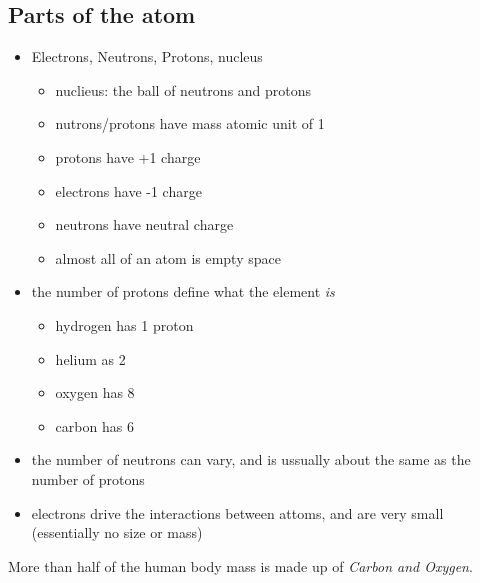 \documentclass{article}
\theoremstyle{definition}
\begin{document}
\subsection{Parts of the atom}
\begin{itemize}
	\item Electrons, Neutrons, Protons, nucleus 
		\begin{itemize}
			\item nuclieus: the ball of neutrons and protons
			\item nutrons/protons have mass atomic unit of 1
			\item protons have +1 charge
			\item electrons have -1 charge
			\item neutrons have neutral charge
			\item almost all of an atom is empty space
		\end{itemize}
	\item the number of protons define what the element \textit{is}
		\begin{itemize}
			\item hydrogen has 1 proton
			\item helium as 2
			\item oxygen has 8
			\item carbon has 6
		\end{itemize}
	\item the number of neutrons can vary, and is ussually about the same as the number of protons
	\item electrons drive the interactions between attoms, and are very small (essentially no size or mass)
\end{itemize}

More than half of the human body mass is made up of \textit{Carbon and Oxygen}.
\end{document}
